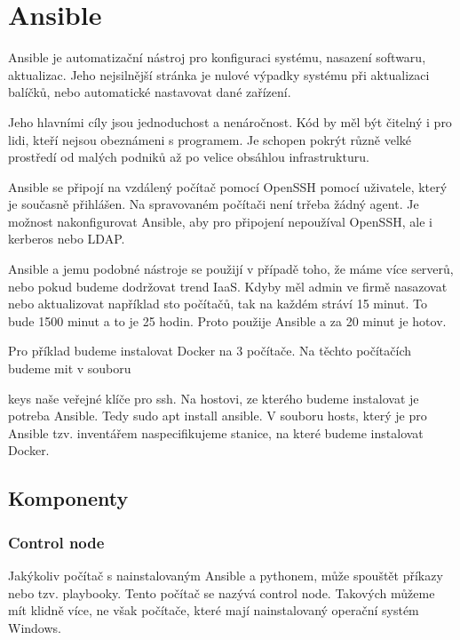 \section{Ansible}

Ansible je automatizační nástroj pro konfiguraci systému, nasazení softwaru, aktualizac. Jeho nejsilnější stránka je nulové výpadky systému při aktualizaci balíčků, nebo automatické nastavovat dané zařízení. 

Jeho hlavními cíly jsou jednoduchost a nenáročnost. Kód by měl být čitelný i pro lidi, kteří nejsou obeznámeni s programem. Je schopen pokrýt různě velké prostředí od malých podniků až po velice obsáhlou infrastrukturu. 

Ansible se připojí na vzdálený počítač pomocí OpenSSH pomocí uživatele, který je současně přihlášen. Na spravovaném počítači není trřeba žádný agent. Je možnost nakonfigurovat Ansible, aby pro připojení nepoužíval OpenSSH, ale i kerberos nebo LDAP. 

Ansible a jemu podobné nástroje se použijí v případě toho, že máme více serverů, nebo pokud budeme dodržovat trend IaaS. Kdyby měl admin ve firmě nasazovat nebo aktualizovat například sto počítačů, tak na každém stráví 15 minut. To bude 1500 minut a to je 25 hodin. Proto použije Ansible a za 20 minut je hotov. 

Pro příklad budeme instalovat Docker na 3 počítače. Na těchto počítačích budeme mit v souboru 


keys naše veřejné klíče pro ssh. Na hostovi, ze kterého budeme instalovat je potreba Ansible. Tedy sudo apt install ansible. V souboru hosts, který je pro Ansible tzv. inventářem naspecifikujeme stanice, na které budeme instalovat Docker. 
	
  	

\subsection{Komponenty}

\subsubsection{Control node}

Jakýkoliv počítač s nainstalovaným Ansible a pythonem, může spouštět příkazy nebo tzv. playbooky. Tento počítač se nazývá control node. Takových můžeme mít klidně více, ne však počítače, které mají nainstalovaný operační systém Windows. 

